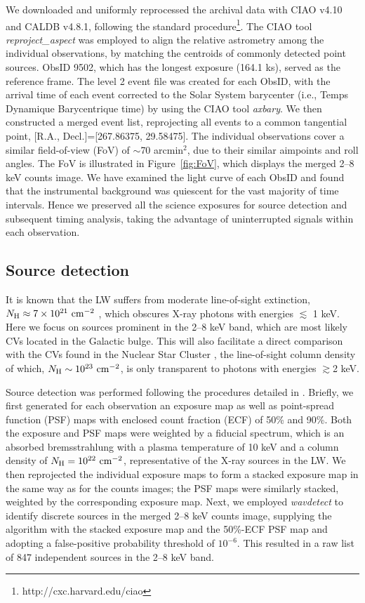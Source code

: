 \documentclass[fleqn,usenatbib]{mnras}
\begin{document}
We downloaded and uniformly reprocessed the archival data with CIAO v4.10 and CALDB v4.8.1, following the standard procedure\footnote{http://cxc.harvard.edu/ciao}.
The CIAO tool \emph{reproject\_aspect} was employed to align the relative astrometry among the individual observations, by matching the centroids of commonly detected point sources. ObsID 9502, which has the longest exposure (164.1 ks), served as the reference frame.
The level 2 event file was created for each ObsID, with the arrival time of each event corrected to the Solar System barycenter (i.e., Temps Dynamique Barycentrique time) by using the CIAO tool \emph{axbary}.
We then constructed a merged event list, reprojecting all events to a common tangential point, [R.A., Decl.]=[267.86375, 29.58475].
The individual observations cover a similar field-of-view (FoV) of $\sim$70 arcmin$^2$, due to their similar aimpoints and roll angles. The FoV is illustrated in Figure~\ref{fig:FoV}, which displays the merged 2--8 keV counts image.
We have examined the light curve of each ObsID and found that the instrumental background was quiescent for the vast majority of time intervals.
Hence we preserved all the science exposures for source detection and subsequent timing analysis, taking the advantage of uninterrupted signals within each observation.  

\subsection{Source detection}\label{subsec:detect}
It is known that the LW suffers from moderate line-of-sight extinction, $N_{\rm H} \approx 7\times10^{21}{\rm~cm^{-2}}$ \citep{2011MNRAS.414..495R}, which obscures X-ray photons with energies $\lesssim$ 1 keV.
Here we focus on sources prominent in the 2--8 keV band, which are most likely CVs located in the Galactic bulge. This will also facilitate a direct comparison with the CVs found in the Nuclear Star Cluster \citep{2018ApJS..235...26Z}, the line-of-sight column density of which, $N_{\rm H} \sim 10^{23}{\rm~cm^{-2}}$, is only transparent to photons with energies $\gtrsim$2 keV. 

Source detection was performed following the procedures detailed in \citet{2018ApJS..235...26Z}.
Briefly, we first generated for each observation an exposure map as well as point-spread function (PSF) maps with enclosed count fraction (ECF) of 50\% and 90\%. 
Both the exposure and PSF maps were weighted by a fiducial spectrum, which is an absorbed bremsstrahlung with a plasma temperature of 10 keV and a column density of $N_{\rm H}=10^{22}{\rm~cm^{-2}}$, representative of the X-ray sources in the LW. 
We then reprojected the individual exposure maps to form a stacked exposure map in the same way as for the counts images; the PSF maps were similarly stacked, weighted by the corresponding exposure map. 
Next, we employed {\it wavdetect} to identify discrete sources in the merged 2--8 keV counts image, supplying the algorithm with the stacked exposure map and the 50\%-ECF PSF map and adopting a false-positive probability threshold of $10^{-6}$. 
This resulted in a raw list of 847 independent sources in the 2--8 keV band. 
\end{document}
